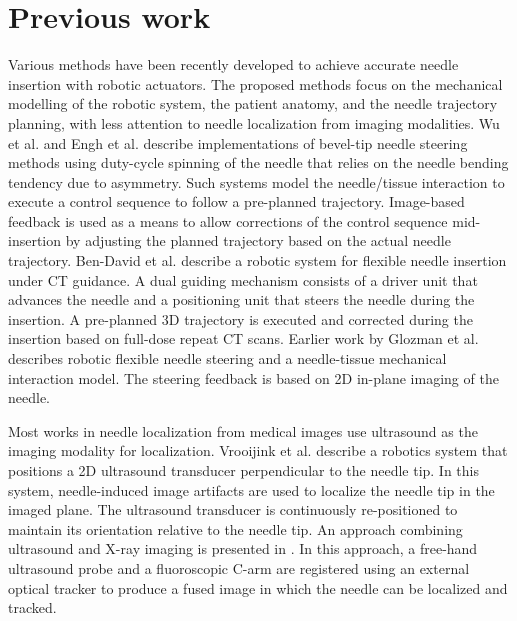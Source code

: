 \section*{Previous work}
Various methods have been recently developed to achieve accurate needle insertion with robotic actuators. The proposed methods focus on the mechanical modelling of the robotic system, the patient anatomy, and the needle trajectory planning, with less attention to needle localization from imaging modalities.
Wu et al. \cite{wu2013automatic} and Engh et al. \cite{engh2010percutaneous} describe implementations of bevel-tip needle steering methods using duty-cycle spinning of the needle that relies on the needle bending tendency due to asymmetry. Such systems model the needle/tissue interaction to execute a control sequence to follow a pre-planned trajectory. Image-based feedback is used as a means to allow corrections of the control sequence mid-insertion by adjusting the planned trajectory based on the actual needle trajectory.
Ben-David et al. \cite{ben2018robotic} describe a robotic system for flexible needle insertion under CT guidance. A dual guiding mechanism consists of a driver unit that advances the needle and a positioning unit that steers the needle during the insertion. A pre-planned 3D trajectory is executed and corrected during the insertion based on full-dose repeat CT scans.
Earlier work by Glozman et al. \cite{glozman2007image} describes robotic flexible needle steering and a needle-tissue mechanical interaction model. The steering feedback is based on 2D in-plane imaging of the needle.

Most works in needle localization from medical images use ultrasound as the imaging modality for localization. Vrooijink et al. \cite{vrooijink2013real} describe a robotics system that positions a 2D ultrasound transducer perpendicular to the needle tip. In this system, needle-induced image artifacts are used to localize the needle tip in the imaged plane. The ultrasound transducer is continuously re-positioned to maintain its orientation relative to the needle tip. An approach combining ultrasound and X-ray imaging is presented in \cite{marinetto2017integration}. In this approach, a free-hand ultrasound probe and a fluoroscopic C-arm are registered using an external optical tracker to produce a fused image in which the needle can be localized and tracked.


